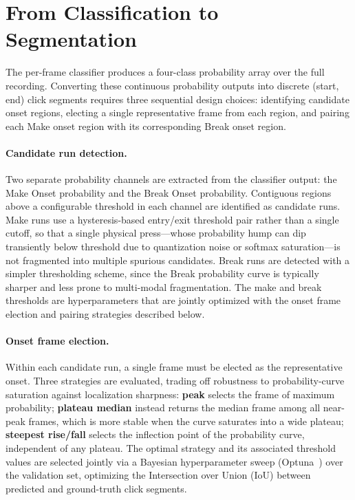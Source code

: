 \section{From Classification to Segmentation}

The per-frame classifier produces a four-class probability array over the full recording. Converting these continuous probability outputs into discrete (start, end) click segments requires three sequential design choices: identifying candidate onset regions, electing a single representative frame from each region, and pairing each Make onset region with its corresponding Break onset region.

\paragraph{Candidate run detection.}
Two separate probability channels are extracted from the classifier output: the Make Onset probability and the Break Onset probability. Contiguous regions above a configurable threshold in each channel are identified as candidate runs. Make runs use a hysteresis-based entry/exit threshold pair rather than a single cutoff, so that a single physical press---whose probability hump can dip transiently below threshold due to quantization noise or softmax saturation---is not fragmented into multiple spurious candidates. Break runs are detected with a simpler thresholding scheme, since the Break probability curve is typically sharper and less prone to multi-modal fragmentation. The make and break thresholds are hyperparameters that are jointly optimized with the onset frame election and pairing strategies described below.

\paragraph{Onset frame election.}
Within each candidate run, a single frame must be elected as the representative onset. Three strategies are evaluated, trading off robustness to probability-curve saturation against localization sharpness: \textbf{peak} selects the frame of maximum probability; \textbf{plateau median} instead returns the median frame among all near-peak frames, which is more stable when the curve saturates into a wide plateau; \textbf{steepest rise/fall} selects the inflection point of the probability curve, independent of any plateau. The optimal strategy and its associated threshold values are selected jointly via a Bayesian hyperparameter sweep (Optuna~\cite{optuna_akiba_2019}) over the validation set, optimizing the Intersection over Union (IoU) between predicted and ground-truth click segments.

